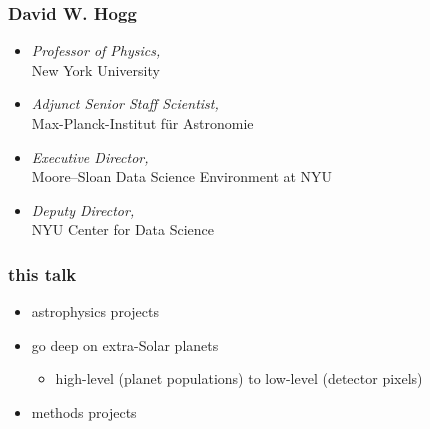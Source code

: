 \documentclass{beamer}
\begin{document}
\begin{frame}
  \frametitle{David W. Hogg}
  \begin{itemize}
  \item \textsl{Professor of Physics,}\\ New York University
  \item \textsl{Adjunct Senior Staff Scientist,}\\ Max-Planck-Institut f\"ur Astronomie
  \item \textsl{Executive Director,}\\ Moore--Sloan Data Science Environment at NYU
  \item \textsl{Deputy Director,}\\ NYU Center for Data Science
  \end{itemize}
\end{frame}

\begin{frame}
  \frametitle{this talk}
  \begin{itemize}
  \item astrophysics projects
  \item go deep on extra-Solar planets
    \begin{itemize}
    \item high-level (planet populations) to low-level (detector pixels)
    \end{itemize}
  \item methods projects
  \end{itemize}
\end{frame}
\end{document}
